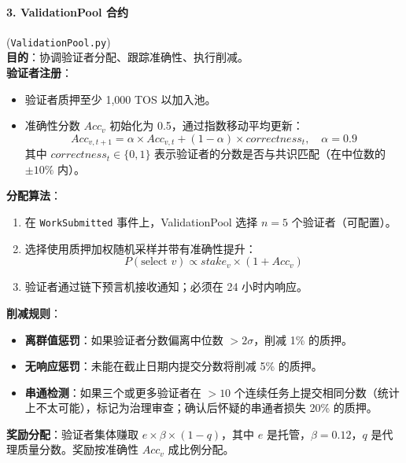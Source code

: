\documentclass[11pt]{article}
\begin{document}
\paragraph{3. ValidationPool 合约} (\texttt{ValidationPool.py})\\
\textbf{目的}：协调验证者分配、跟踪准确性、执行削减。\\
\textbf{验证者注册}：
\begin{itemize}[noitemsep]
  \item 验证者质押至少 1,000 TOS 以加入池。
  \item 准确性分数 $Acc_v$ 初始化为 0.5，通过指数移动平均更新：
    \begin{equation}
    Acc_{v,t+1} = \alpha \times Acc_{v,t} + (1-\alpha) \times correctness_t, \quad \alpha = 0.9
    \end{equation}
    其中 $correctness_t \in \{0,1\}$ 表示验证者的分数是否与共识匹配（在中位数的 $\pm10\%$ 内）。
\end{itemize}
\textbf{分配算法}：
\begin{enumerate}[noitemsep]
  \item 在 \texttt{WorkSubmitted} 事件上，ValidationPool 选择 $n=5$ 个验证者（可配置）。
  \item 选择使用质押加权随机采样并带有准确性提升：
    \begin{equation}
    P(\text{select } v) \propto stake_v \times (1 + Acc_v)
    \end{equation}
  \item 验证者通过链下预言机接收通知；必须在 24 小时内响应。
\end{enumerate}
\textbf{削减规则}：
\begin{itemize}[noitemsep]
  \item \textbf{离群值惩罚}：如果验证者分数偏离中位数 $>2\sigma$，削减 1\% 的质押。
  \item \textbf{无响应惩罚}：未能在截止日期内提交分数将削减 5\% 的质押。
  \item \textbf{串通检测}：如果三个或更多验证者在 $>10$ 个连续任务上提交相同分数（统计上不太可能），标记为治理审查；确认后怀疑的串通者损失 20\% 的质押。
\end{itemize}
\textbf{奖励分配}：验证者集体赚取 $e \times \beta \times (1-q)$，其中 $e$ 是托管，$\beta=0.12$，$q$ 是代理质量分数。奖励按准确性 $Acc_v$ 成比例分配。
\end{document}
